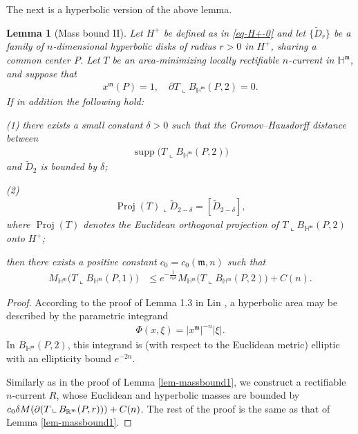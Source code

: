 \documentclass[11pt,reqno]{amsart}
\newcommand{\fm}{\mathfrak{m}}
\renewcommand{\leq}{\leqslant}
\newtheorem{lemma}[theorem]{Lemma}
\theoremstyle{definition}
\numberwithin{equation}{section}
\begin{document}
The next is a hyperbolic version of the above lemma.


\begin{lemma}[Mass bound II]\label{lem-massbound2}
Let $H^+$ be defined as in \eqref{eq-H+-0} and let $\{\tilde D_r\}$ be a family of $n$-dimensional hyperbolic disks of radius $r>0$ in $H^+$, sharing a common center $P$. Let $T$ be an area-minimizing locally rectifiable $n$-current in $\mathbb{H}^\fm$, and suppose that
\begin{align}
   x^\fm(P)=1, \quad \partial T \mathbin{\llcorner} B_{\mathbb{H}^\fm}(P, 2) =0. 
\end{align}
If in addition the following hold:

(1) there exists a small constant $\delta>0$ such that the Gromov–Hausdorff distance between
\begin{align}
    \operatorname{supp}\bigl(T \mathbin{\llcorner} B_{\mathbb{H}^\fm}(P, 2)\bigr)
\end{align}
and $\tilde D_2$ is bounded by $\delta$;

(2)
\begin{align}\label{eq-Proj1}
     \operatorname{Proj}(T) \mathbin{\llcorner} \tilde{D}_{2-\delta} = [\tilde{D}_{2-\delta}],
\end{align}
where $\operatorname{Proj}(T)$ denotes the Euclidean orthogonal projection of $T \mathbin{\llcorner} B_{\mathbb{H}^\fm}(P, 2)$ onto $H^+$;

then there exists a positive constant $c_0 = c_0(\fm, n)$ such that
\begin{align}
    M_{\mathbb{H}^\fm}\bigl(T \mathbin{\llcorner} B_{\mathbb{H}^\fm}(P, 1)\bigr)
    &\leq e^{-\frac{1}{c_0\delta}} M_{\mathbb{H}^\fm}\bigl(T \mathbin{\llcorner} B_{\mathbb{H}^\fm}(P, 2)\bigr) + C(n).
\end{align}
\end{lemma}
\begin{proof}
According to the proof of Lemma 1.3 in Lin \cite{Lin1989CPAM}, a hyperbolic area may be described by the parametric integrand
    \begin{align}
        \Phi(x,\xi) = |x^\fm|^{-n}|\xi|.
    \end{align}
    In $B_{\mathbb{H}^\fm}(P, 2)$, this integrand is (with respect to the Euclidean metric) elliptic with an ellipticity bound $e^{-2n}$.


Similarly as in the proof of Lemma \ref{lem-massbound1}, we construct a rectifiable $n$-current $R$, whose Euclidean and hyperbolic masses are bounded by $c_0\delta M(\partial (T \,\Large\llcorner\normalsize \, B_{\mathbb{R}^\fm}(P, r))) + C(n)$.
The rest of the proof is the same as that of Lemma \ref{lem-massbound1}.
\end{proof}
\end{document}
